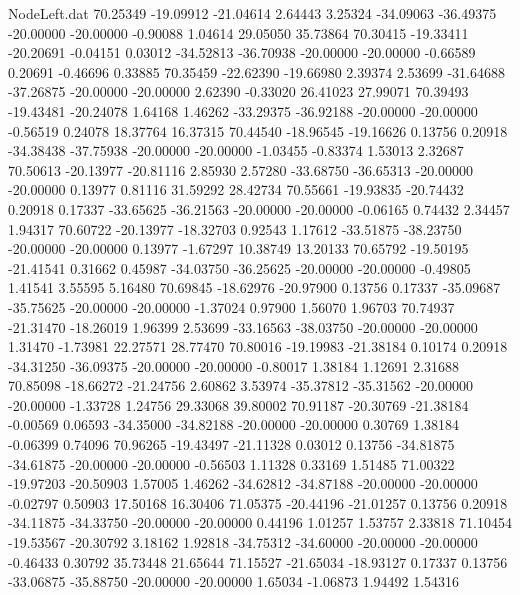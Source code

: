\begin{filecontents}{NodeLeft.dat}
  70.25349  -19.09912  -21.04614     2.64443    3.25324  -34.09063  -36.49375  -20.00000  -20.00000   -0.90088    1.04614   29.05050   35.73864
  70.30415  -19.33411  -20.20691    -0.04151    0.03012  -34.52813  -36.70938  -20.00000  -20.00000   -0.66589    0.20691   -0.46696    0.33885
  70.35459  -22.62390  -19.66980     2.39374    2.53699  -31.64688  -37.26875  -20.00000  -20.00000    2.62390   -0.33020   26.41023   27.99071
  70.39493  -19.43481  -20.24078     1.64168    1.46262  -33.29375  -36.92188  -20.00000  -20.00000   -0.56519    0.24078   18.37764   16.37315
  70.44540  -18.96545  -19.16626     0.13756    0.20918  -34.38438  -37.75938  -20.00000  -20.00000   -1.03455   -0.83374    1.53013    2.32687
  70.50613  -20.13977  -20.81116     2.85930    2.57280  -33.68750  -36.65313  -20.00000  -20.00000    0.13977    0.81116   31.59292   28.42734
  70.55661  -19.93835  -20.74432     0.20918    0.17337  -33.65625  -36.21563  -20.00000  -20.00000   -0.06165    0.74432    2.34457    1.94317
  70.60722  -20.13977  -18.32703     0.92543    1.17612  -33.51875  -38.23750  -20.00000  -20.00000    0.13977   -1.67297   10.38749   13.20133
  70.65792  -19.50195  -21.41541     0.31662    0.45987  -34.03750  -36.25625  -20.00000  -20.00000   -0.49805    1.41541    3.55595    5.16480
  70.69845  -18.62976  -20.97900     0.13756    0.17337  -35.09687  -35.75625  -20.00000  -20.00000   -1.37024    0.97900    1.56070    1.96703
  70.74937  -21.31470  -18.26019     1.96399    2.53699  -33.16563  -38.03750  -20.00000  -20.00000    1.31470   -1.73981   22.27571   28.77470
  70.80016  -19.19983  -21.38184     0.10174    0.20918  -34.31250  -36.09375  -20.00000  -20.00000   -0.80017    1.38184    1.12691    2.31688
  70.85098  -18.66272  -21.24756     2.60862    3.53974  -35.37812  -35.31562  -20.00000  -20.00000   -1.33728    1.24756   29.33068   39.80002
  70.91187  -20.30769  -21.38184    -0.00569    0.06593  -34.35000  -34.82188  -20.00000  -20.00000    0.30769    1.38184   -0.06399    0.74096
  70.96265  -19.43497  -21.11328     0.03012    0.13756  -34.81875  -34.61875  -20.00000  -20.00000   -0.56503    1.11328    0.33169    1.51485
  71.00322  -19.97203  -20.50903     1.57005    1.46262  -34.62812  -34.87188  -20.00000  -20.00000   -0.02797    0.50903   17.50168   16.30406
  71.05375  -20.44196  -21.01257     0.13756    0.20918  -34.11875  -34.33750  -20.00000  -20.00000    0.44196    1.01257    1.53757    2.33818
  71.10454  -19.53567  -20.30792     3.18162    1.92818  -34.75312  -34.60000  -20.00000  -20.00000   -0.46433    0.30792   35.73448   21.65644
  71.15527  -21.65034  -18.93127     0.17337    0.13756  -33.06875  -35.88750  -20.00000  -20.00000    1.65034   -1.06873    1.94492    1.54316

\end{filecontents}
